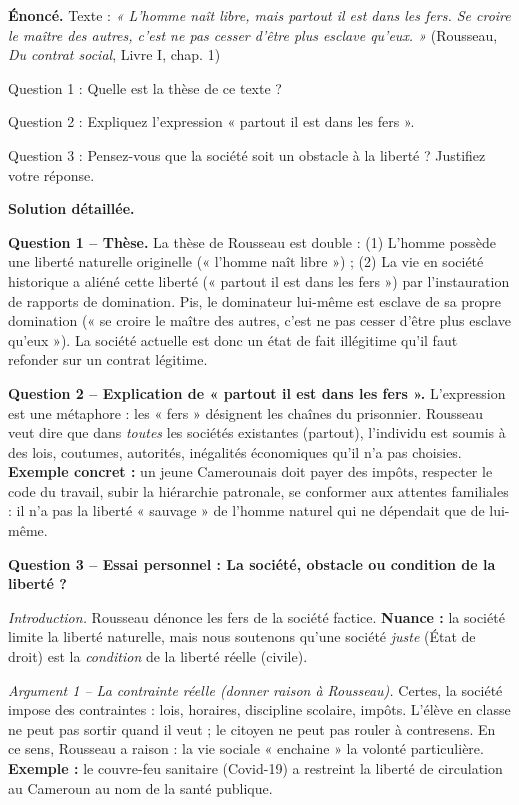 \documentclass[11pt]{article}
\newcommand{\cle}[1]{{\popxbold\color{popdark}#1}}
\newcounter{popsec}
\newcounter{popsub}
\newcommand{\courssub}[1]{%
  \stepcounter{popsub}%
  \par\vspace{9pt}\noindent{\popxbold\fontsize{11.5}{13}\selectfont\color{popink}{\color{poporange}\thepopsec.\thepopsub}\hspace{6pt}#1}\par\nopagebreak\vspace{4pt}
}
\begin{document}
\courssub{Application guidée : un sujet complet corrigé}

\begin{exoresolu}
\textbf{Énoncé.} Texte : \emph{« L'homme naît libre, mais partout il est dans les fers. Se croire le maître des autres, c'est ne pas cesser d'être plus esclave qu'eux. »} (Rousseau, \emph{Du contrat social}, Livre I, chap. 1)

Question 1 : Quelle est la thèse de ce texte ?

Question 2 : Expliquez l'expression « partout il est dans les fers ».

Question 3 : Pensez-vous que la société soit un obstacle à la liberté ? Justifiez votre réponse.

\tcblower
\textbf{Solution détaillée.}

\textbf{Question 1 -- Thèse.} La thèse de Rousseau est double : (1) L'homme possède une liberté naturelle originelle (« l'homme naît libre ») ; (2) La vie en société historique a aliéné cette liberté (« partout il est dans les fers ») par l'instauration de rapports de domination. Pis, le dominateur lui-même est esclave de sa propre domination (« se croire le maître des autres, c'est ne pas cesser d'être plus esclave qu'eux »). La société actuelle est donc un état de fait illégitime qu'il faut refonder sur un contrat légitime.

\textbf{Question 2 -- Explication de « partout il est dans les fers ».} L'expression est une \cle{métaphore} : les « fers » désignent les chaînes du prisonnier. Rousseau veut dire que dans \emph{toutes} les sociétés existantes (partout), l'individu est soumis à des lois, coutumes, autorités, inégalités économiques qu'il n'a pas choisies. \textbf{Exemple concret :} un jeune Camerounais doit payer des impôts, respecter le code du travail, subir la hiérarchie patronale, se conformer aux attentes familiales : il n'a pas la liberté « sauvage » de l'homme naturel qui ne dépendait que de lui-même.

\textbf{Question 3 -- Essai personnel : La société, obstacle ou condition de la liberté ?}

\emph{Introduction.} Rousseau dénonce les fers de la société factice. \textbf{Nuance :} la société limite la liberté naturelle, mais nous soutenons qu'une société \emph{juste} (État de droit) est la \emph{condition} de la liberté réelle (civile).

\emph{Argument 1 -- La contrainte réelle (donner raison à Rousseau).} Certes, la société impose des contraintes : lois, horaires, discipline scolaire, impôts. L'élève en classe ne peut pas sortir quand il veut ; le citoyen ne peut pas rouler à contresens. En ce sens, Rousseau a raison : la vie sociale « enchaine » la volonté particulière. \textbf{Exemple :} le couvre-feu sanitaire (Covid-19) a restreint la liberté de circulation au Cameroun au nom de la santé publique.


\end{exoresolu}
\end{document}
